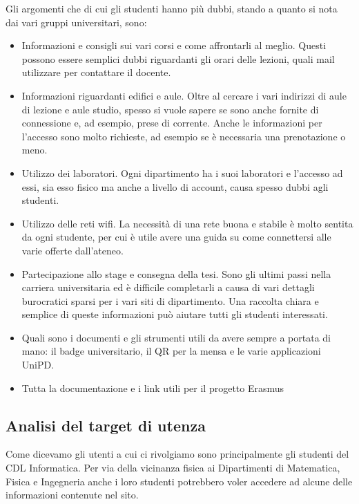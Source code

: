 Gli argomenti che di cui gli studenti hanno più dubbi, stando a quanto si nota dai vari gruppi universitari, sono:
\begin{itemize}
    \item Informazioni e consigli sui vari corsi e come affrontarli al meglio. Questi possono essere semplici dubbi riguardanti gli orari delle lezioni, quali mail utilizzare per contattare il docente.
    \item Informazioni riguardanti edifici e aule. Oltre al cercare i vari indirizzi di aule di lezione e aule studio, spesso si vuole sapere se sono anche fornite di connessione e, ad esempio, prese di corrente. Anche le informazioni per l'accesso sono molto richieste, ad esempio se è necessaria una prenotazione o meno. 
    \item Utilizzo dei laboratori. Ogni dipartimento ha i suoi laboratori e l'accesso ad essi, sia esso fisico ma anche a livello di account, causa spesso dubbi agli studenti.
    \item Utilizzo delle reti wifi. La necessità di una rete buona e stabile è molto sentita da ogni studente, per cui è utile avere una guida su come connettersi alle varie offerte dall'ateneo.   
    \item Partecipazione allo stage e consegna della tesi. Sono gli ultimi passi nella carriera universitaria ed è difficile completarli a causa di vari dettagli burocratici sparsi per i vari siti di dipartimento. Una raccolta chiara e semplice di queste informazioni può aiutare tutti gli studenti interessati.
    \item Quali sono i documenti e gli strumenti utili da avere sempre a portata di mano: il badge universitario, il QR per la mensa e le varie applicazioni UniPD.
    \item Tutta la documentazione e i link utili per il progetto Erasmus
\end{itemize}

\subsection{Analisi del target di utenza}

Come dicevamo gli utenti a cui ci rivolgiamo sono principalmente gli studenti del CDL Informatica. Per via della vicinanza fisica ai Dipartimenti di Matematica, Fisica e Ingegneria anche i loro studenti potrebbero voler accedere ad alcune delle informazioni contenute nel sito.

